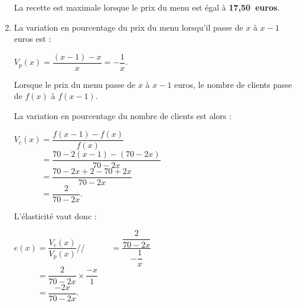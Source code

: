 \begin{corrige}
\begin{enumerate}
          La recette est maximale lorsque le prix du menu est égal à \textbf{17,50~euros}.
          \item %
          La variation en pourcentage du prix du menu lorsqu'il passe de $x$ à $x-1$ euros est :
          \par
          $V_p(x)=\dfrac{(x-1)-x}{x}=-\dfrac{1}{x}$.
          \par
          Lorsque le prix du menu passe de $x$ à $x-1$ euros, le nombre de clients passe de $f(x)$ à $f(x-1)$.
          \par
          La variation en pourcentage du nombre de clients est alors :
          \par
          $V_c(x)=\dfrac{f(x-1)-f(x)}{f(x)}$\\
          $\phantom{V_c(x)}=\dfrac{70-2(x-1)-(70-2x)}{70-2x}$\\
          $\phantom{V_c(x)}=\dfrac{70-2x+2-70+2x}{70-2x}$\\
          $\phantom{V_c(x)}=\dfrac{2}{70-2x}.$
          \par
          L'élasticité vaut donc :
          \par
          $e(x)=\dfrac{V_c(x)}{V_p(x)}$//
          $\phantom{e(x)}=\dfrac{\dfrac{2}{70-2x}}{-\dfrac{1}{x}}$\\
          $\phantom{e(x)}=\dfrac{2}{70-2x} \times \dfrac{-x}{1}$\\
          $\phantom{e(x)}=\dfrac{-2x}{70-2x}.$
          \par
          \vspace{2mm}

\end{enumerate}
\end{corrige}
